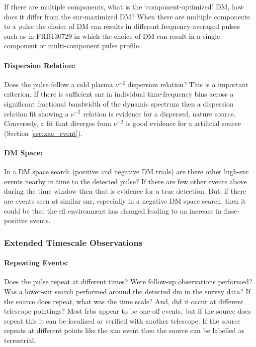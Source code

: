 \documentclass[a4paper,fleqn,usenatbib]{mnras}
\begin{document}
If there are multiple components, what is the `component-optimized' DM, how does
it differ from the \gls{snr}-maximized DM? When there are multiple components to
a pulse the choice of DM can results in different frequency-averaged pulses such
as in FRB130729 in which the choice of DM can result in a single component or
multi-component pulse profile. 

\paragraph{Dispersion Relation:}

Does the pulse follow a cold plasma $\nu^{-2}$ dispersion relation? This is a
important criterion. If there is sufficient \gls{snr} in individual
time-frequency bins across a significant fractional bandwidth of the dynamic
spectrum then a dispersion relation fit showing a $\nu^{-2}$ relation is
evidence for a dispersed, nature source. Conversely, a fit that diverges from
$\nu^{-2}$ is good evidence for a artificial source (Section
\ref{sec:xao_event}).

\paragraph{DM Space:}

In a DM space search (positive and negative DM trials) are there other
high-\gls{snr} events nearby in time to the detected pulse? If there are few
other events above during the time window then that is evidence for a true
detection. But, if there are events seen at similar \gls{snr}, especially in a
negative DM space search, then it could be that the \gls{rfi} environment has
changed leading to an increase in flase-positive events.

\subsubsection{Extended Timescale Observations}

\paragraph{Repeating Events:}

Does the pulse repeat at different times? Were follow-up observations performed?
Was a lower-\gls{snr} search performed around the detected \gls{dm} in the
survey data? If the source does repeat, what was the time scale? And, did it
occur at different telescope pointings? Most \glspl{frb} appear to be one-off
events, but if the source does repeat this it can be localized or verified with
another telescope. If the source repeats at different points like the \gls{xao}
event then the source can be labelled as terrestrial.
\end{document}

